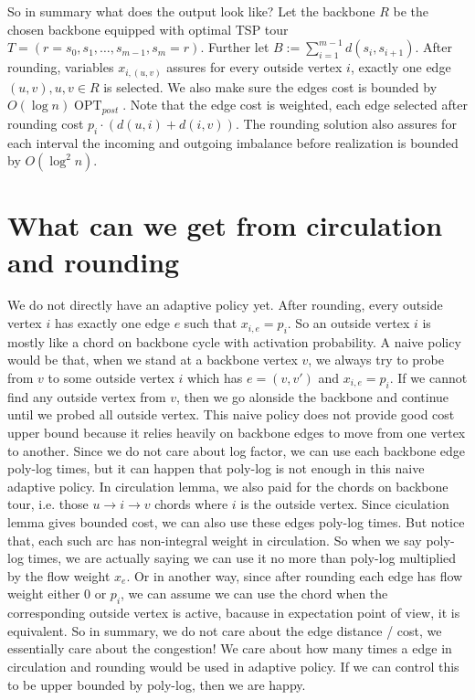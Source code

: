 \documentclass[11pt]{article}
\DeclareMathOperator{\OPT}{OPT}
\newcommand{\1}{\mathbf{1}}
\begin{document}
So in summary what does the output look like? Let the backbone $R$ be the chosen backbone equipped
with optimal TSP tour $T = (r = s_0, s_1, \dots, s_{m-1}, s_m = r)$. Further let
$B := \sum_{i=1}^{m-1} d(s_i, s_{i+1})$. After rounding, variables $x_{i, (u,v)}$
assures for every outside vertex $i$, exactly one edge $(u,v), u, v \in R$ is selected.
We also make sure the edges cost is bounded by $O(\log n) \OPT_{post}$. Note that
the edge cost is weighted, each edge selected after rounding cost $p_i \cdot (d(u,i)+d(i,v))$.
The rounding solution also assures for each interval the incoming and outgoing 
imbalance before realization is bounded by $O(\log^2 n)$.

\section{What can we get from circulation and rounding}
We do not directly have an adaptive policy yet. After rounding, 
every outside vertex $i$ has exactly one edge $e$ such that $x_{i,e}=p_i$.
So an outside vertex $i$ is mostly like a chord on backbone cycle with activation probability.
A naive policy would be that, when we stand at a backbone vertex $v$, we always 
try to probe from $v$ to some outside vertex $i$ which has $e = (v, v')$ and 
$x_{i,e}=p_i$. If we cannot find any outside vertex from $v$, then we go alonside
the backbone and continue until we probed all outside vertex. This naive policy 
does not provide good cost upper bound because it relies heavily on backbone edges 
to move from one vertex to another. Since we do not care about log factor,
we can use each backbone edge poly-log times, but it can happen that poly-log is 
not enough in this naive adaptive policy. In circulation lemma, we also paid for the chords
on backbone tour, i.e. those $u \rightarrow i \rightarrow v$ chords where $i$ is the outside vertex.
Since ciculation lemma gives bounded cost, we can also use these edges poly-log times.
But notice that, each such arc has non-integral weight in circulation. So when we say poly-log times,
we are actually saying we can use it no more than poly-log multiplied by the flow weight $x_e$.
Or in another way, since after rounding each edge has flow weight either $0$ or $p_i$,
we can assume we can use the chord when the corresponding outside vertex is active, bacause
in expectation point of view, it is equivalent. So in summary, we do not care about 
the edge distance / cost, we essentially care about the congestion! We care about 
how many times a edge in circulation and rounding would be used in adaptive policy.
If we can control this to be upper bounded by poly-log, then we are happy.
\end{document}
